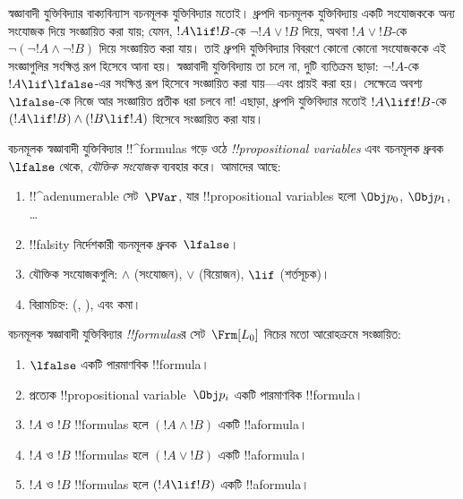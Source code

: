 \documentclass[../../../include/open-logic-section]{subfiles}
\begin{document}


স্বজ্ঞাবাদী যুক্তিবিদ্যার বাক্যবিন্যাস বচনমূলক যুক্তিবিদ্যার মতোই।
ধ্রুপদি বচনমূলক যুক্তিবিদ্যায় একটি সংযোজককে অন্য সংযোজক দিয়ে
সংজ্ঞায়িত করা যায়; যেমন, $!A \lif !B$-কে $\lnot !A \lor !B$
দিয়ে, অথবা $!A \lor !B$-কে $\lnot(\lnot !A \land \lnot
!B)$ দিয়ে সংজ্ঞায়িত করা যায়। তাই ধ্রুপদি যুক্তিবিদ্যার বিবরণে
কোনো কোনো সংযোজককে এই সংজ্ঞাগুলির সংক্ষিপ্ত রূপ হিসেবে আনা হয়।
স্বজ্ঞাবাদী যুক্তিবিদ্যায় তা চলে না, দুটি ব্যতিক্রম ছাড়া:
$\lnot !A$-কে $!A \lif \lfalse$-এর সংক্ষিপ্ত রূপ হিসেবে
সংজ্ঞায়িত করা যায়---এবং প্রায়ই করা হয়। সেক্ষেত্রে অবশ্য
$\lfalse$-কে নিজে আর সংজ্ঞায়িত প্রতীক ধরা চলবে না!{} এছাড়া,
ধ্রুপদি যুক্তিবিদ্যার মতোই $!A \liff !B$-কে $(!A \lif !B) \land
(!B \lif !A)$ হিসেবে সংজ্ঞায়িত করা যায়।

বচনমূলক স্বজ্ঞাবাদী যুক্তিবিদ্যার !!^{formula}s গড়ে ওঠে
\emph{!!{propositional variable}s} এবং বচনমূলক ধ্রুবক~$\lfalse$
থেকে, \emph{যৌক্তিক সংযোজক} ব্যবহার করে। আমাদের আছে:

\begin{enumerate}
\item !!^a{denumerable} সেট~$\PVar$, যার !!{propositional variable}s
  হলো $\Obj p_0$, $\Obj p_1$, \dots
\item !!{falsity} নির্দেশকারী বচনমূলক ধ্রুবক~$\lfalse$।
\item যৌক্তিক সংযোজকগুলি: $\land$ (সংযোজন), $\lor$ (বিয়োজন),
  $\lif$ (শর্তসূচক)।
\item বিরামচিহ্ন: (, ), এবং কমা।
\end{enumerate}

\begin{defn}[সূত্র]
 বচনমূলক স্বজ্ঞাবাদী যুক্তিবিদ্যার
\emph{!!{formula}s}র সেট~$\Frm[L_0]$ নিচের মতো আরোহক্রমে
সংজ্ঞায়িত:
\begin{enumerate}
\item $\lfalse$ একটি পারমাণবিক !!{formula}।

\item প্রত্যেক !!{propositional variable}~$\Obj p_i$ একটি পারমাণবিক
  !!{formula}।

\item $!A$ ও $!B$ !!{formula}s হলে $(!A \land
  !B)$ একটি !!a{formula}।

\item $!A$ ও $!B$ !!{formula}s হলে $(!A \lor !B)$
  একটি !!a{formula}।

\item $!A$ ও $!B$ !!{formula}s হলে $(!A \lif !B)$
  একটি !!a{formula}।

\end{enumerate}
\end{defn}
\end{document}
